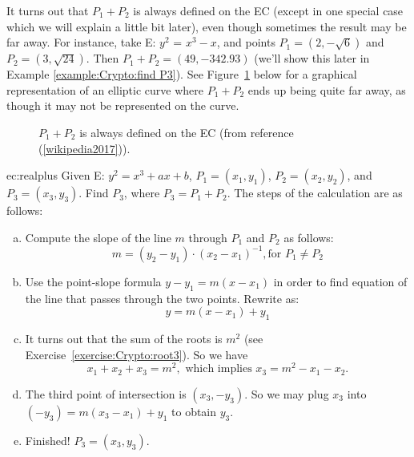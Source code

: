 It turns out that $P_1 + P_2$ is always defined on the EC (except in one special case which we will explain a little bit later), even though sometimes the result may be far away.  For instance, take E: $ y^2$ = $x^3 - x$, and points $P_1 = (2, -\sqrt{6})$ and $P_2 = (3, \sqrt{24})$.  Then $P_1 + P_2 = (49,-342.93)$ (we'll show this later in Example \ref{example:Crypto:find P3}). See Figure~\ref{fig:DH:DHKE_16} below for a graphical representation of an elliptic curve where $P_1 + P_2$ ends up being quite far away, as though it may not be represented on the curve.
\begin{figure}[H]
	  \caption{\label{fig:DH:DHKE_16} $P_1 + P_2$ is always defined on the EC (from reference (\ref{wikipedia2017})).}
\end{figure}
\begin{example}{ec:realplus}
Given E: $y^2 = x^3 + ax + b$, $P_1 = (x_1, y_1)$, $P_2 = (x_2, y_2)$, and $P_3 = (x_3, y_3)$. Find $P_3$, where $ P_3 =  P_1 + P_2$.
The steps of the calculation are as follows:
\begin{enumerate}[(a)]
\item
Compute the slope of the line $m$ through $P_1$ and $P_2$ as follows:  \[ m =(y_2 - y_1) \cdot (x_2- x_1)^{-1}, \text{for } P_1 \neq P_2  \] 
\item
Use the point-slope formula $y - y_1 = m(x-x_1)$  in order to find equation of the line that passes through the two points.  Rewrite as: \[y  = m(x-x_1) + y_1\]
\item
It turns out that the sum of the roots is $m^2$ (see Exercise~\ref{exercise:Crypto:root3}). So we have
\[x_1 + x_2 + x_3 = m^2, \text{ which implies } x_3 =   m^2 -  x_1 - x_2.\]
\item  The third point of intersection is $(x_3, -y_3)$. So  we may plug $x_3$ into $(-y_3)  = m(x_3-x_1) + y_1$ to obtain $y_3$. 
\item Finished!  $P_3 = (x_3,y_3)$.
\end{enumerate}
 \end{example} 

